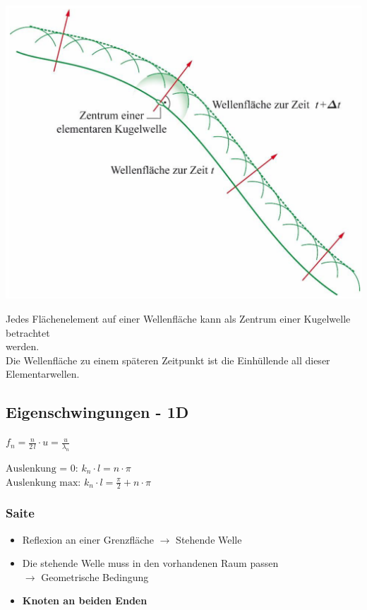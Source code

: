 \begin{minipage}{0.48\linewidth}
\includegraphics[width=0.9\linewidth]{Bilder/Wellen-Optik/huygens}
\end{minipage}
\hfill
\begin{minipage}{0.48\linewidth}
\raggedright
Jedes Flächenelement auf einer Wellenfläche kann als Zentrum einer Kugelwelle betrachtet\\
werden. \\
Die Wellenfläche zu einem späteren Zeitpunkt ist die Einhüllende all dieser Elementarwellen.
\end{minipage}

\subsection{Eigenschwingungen - 1D}

\begin{minipage}{0.3\linewidth}
$ \boxed{ f_n = \frac{n}{2 \, l} \cdot u = \frac{u}{\lambda_n} } $
\end{minipage}
\hfill
\begin{minipage}{0.66\linewidth}
$ \boxed{ \text{Auslenkung = 0: } k_n \cdot l = n \cdot \pi } $ \\
$ \boxed{ \text{Auslenkung max: } k_n \cdot l = \frac{\pi}{2} + n \cdot \pi  } $
\end{minipage}


\subsubsection{Saite}

\begin{itemize}
	\item Reflexion an einer Grenzfläche $\rightarrow$  Stehende Welle 
	\item Die stehende Welle muss in den vorhandenen Raum passen \\
		 $\rightarrow$ Geometrische Bedingung 
	\item \textbf{Knoten an beiden Enden} 
\end{itemize}



